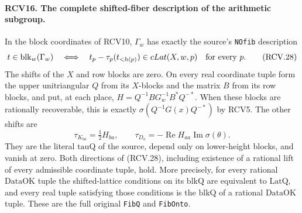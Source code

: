 \paragraph{RCV16. The complete shifted-fiber description of the arithmetic subgroup.}
\label{claim:RCV16}
In the block coordinates of RCV10, \(\Gamma_w\) has exactly the
source's \texttt{NOfib} description
\[
 t\in\operatorname{blk}_w(\Gamma_w)
 \quad\Longleftrightarrow\quad
 t_p-\tau_p(t_{<h(p)})\in cLat(X,w,p)\quad\hbox{for every }p.
\tag{RCV.28}
\]
The shifts of the \(X\) and row blocks are zero.  On every real
coordinate tuple form the upper unitriangular \(Q\) from its
\(X\)-blocks and the matrix \(B\) from its row blocks, and put,
at each place, \(H=Q^{-1}BG_w^{-1}B^*Q^{-*}\).
When these blocks are rationally recoverable, this is exactly
\(\sigma(Q^{-1}G(x)Q^{-*})\) by RCV5.  The other shifts are
\[
 \tau_{K_{ba}}=\tfrac12 H_{ba},\qquad
 \tau_{D_a}=-\operatorname{Re}H_{aa}
                                  \operatorname{Im}\sigma(\theta).
\tag{RCV.29}
\]
They are the literal \(\mathrm{tauQ}\) of the source, depend only
on lower-height blocks, and vanish at zero.  Both directions of
(RCV.28), including existence of a rational lift of every admissible
coordinate tuple, hold.  More precisely, for every rational
\(\mathrm{DataOK}\) tuple the shifted-lattice conditions on its
\(\mathrm{blkQ}\) are equivalent to \(\mathrm{LatQ}\), and
every real tuple satisfying those conditions is the \(\mathrm{blkQ}\)
of a rational \(\mathrm{DataOK}\) tuple.  These are the full
original \texttt{FibQ} and \texttt{FibOnto}.
